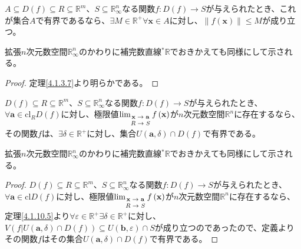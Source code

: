 \documentclass[dvipdfmx]{jsarticle}
\begin{document}
\begin{thm}\label{4.1.10.7}
$A \subseteq D(f) \subseteq R \subseteq \mathbb{R}^{m}$、$S \subseteq \mathbb{R}_{\infty}^{n}$なる関数$f:D(f) \rightarrow S$が与えられたとき、これが集合$A$で有界であるなら、$\exists M \in \mathbb{R}^{+}\forall\mathbf{x} \in A$に対し、$\left\| f\left( \mathbf{x} \right) \right\| \leq M$が成り立つ。\par
拡張$n$次元数空間$\mathbb{R}_{\infty}^{n}$のかわりに補完数直線${}^{*}\mathbb{R}$でおきかえても同様にして示される。
\end{thm}
\begin{proof} 定理\ref{4.1.3.7}より明らかである。
\end{proof}
\begin{thm}\label{4.1.10.8}
$D(f) \subseteq R \subseteq \mathbb{R}^{m}$、$S \subseteq \mathbb{R}_{\infty}^{n}$なる関数$f:D(f) \rightarrow S$が与えられたとき、$\forall\mathbf{a} \in \mathrm{cl}_{R}{D(f)}$に対し、極限値$\lim_{\scriptsize \begin{matrix} \mathbf{x} \rightarrow \mathbf{a} \\ R \rightarrow S \\\end{matrix}}{f\left( \mathbf{x} \right)}$が$n$次元数空間$\mathbb{R}^{n}$に存在するなら、その関数$f$は、$\exists\delta \in \mathbb{R}^{+}$に対し、集合$U\left( \mathbf{a},\delta \right) \cap D(f)$で有界である。\par
拡張$n$次元数空間$\mathbb{R}_{\infty}^{n}$のかわりに補完数直線${}^{*}\mathbb{R}$でおきかえても同様にして示される。
\end{thm}
\begin{proof}
$D(f) \subseteq R \subseteq \mathbb{R}^{m}$、$S \subseteq \mathbb{R}_{\infty}^{n}$なる関数$f:D(f) \rightarrow S$が与えられたとき、$\forall\mathbf{a} \in \mathrm{cl}{D(f)}$に対し、極限値$\lim_{\scriptsize \begin{matrix} \mathbf{x} \rightarrow \mathbf{a} \\ R \rightarrow S \\\end{matrix}}{f\left( \mathbf{x} \right)}$が$n$次元数空間$\mathbb{R}^{n}$に存在するなら、定理\ref{4.1.10.5}より$\forall\varepsilon \in \mathbb{R}^{+}\exists\delta \in \mathbb{R}^{+}$に対し、$V\left( f|U\left( \mathbf{a},\delta \right) \cap D(f) \right) \subseteq U\left( \mathbf{b},\varepsilon \right) \cap S$が成り立つのであったので、定義よりその関数$f$はその集合$U\left( \mathbf{a},\delta \right) \cap D(f)$で有界である。
\end{proof}
\end{document}

